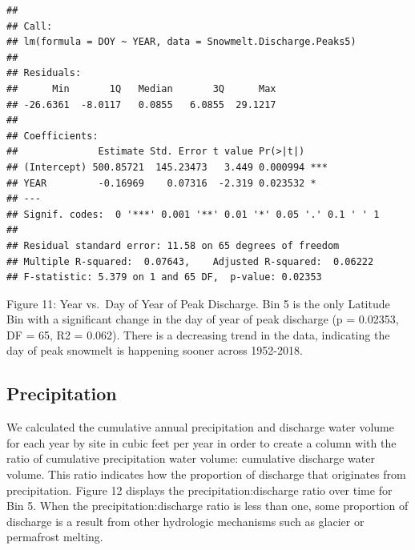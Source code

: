 \documentclass[12pt,]{article}
\begin{document}
\begin{verbatim}
## 
## Call:
## lm(formula = DOY ~ YEAR, data = Snowmelt.Discharge.Peaks5)
## 
## Residuals:
##      Min       1Q   Median       3Q      Max 
## -26.6361  -8.0117   0.0855   6.0855  29.1217 
## 
## Coefficients:
##              Estimate Std. Error t value Pr(>|t|)    
## (Intercept) 500.85721  145.23473   3.449 0.000994 ***
## YEAR         -0.16969    0.07316  -2.319 0.023532 *  
## ---
## Signif. codes:  0 '***' 0.001 '**' 0.01 '*' 0.05 '.' 0.1 ' ' 1
## 
## Residual standard error: 11.58 on 65 degrees of freedom
## Multiple R-squared:  0.07643,    Adjusted R-squared:  0.06222 
## F-statistic: 5.379 on 1 and 65 DF,  p-value: 0.02353
\end{verbatim}

Figure 11: Year vs.~Day of Year of Peak Discharge. Bin 5 is the only
Latitude Bin with a significant change in the day of year of peak
discharge (p = 0.02353, DF = 65, R2 = 0.062). There is a decreasing
trend in the data, indicating the day of peak snowmelt is happening
sooner across 1952-2018.

\hypertarget{precipitation-1}{%
\subsection{Precipitation}\label{precipitation-1}}

We calculated the cumulative annual precipitation and discharge water
volume for each year by site in cubic feet per year in order to create a
column with the ratio of cumulative precipitation water volume:
cumulative discharge water volume. This ratio indicates how the
proportion of discharge that originates from precipitation. Figure 12
displays the precipitation:discharge ratio over time for Bin 5. When the
precipitation:discharge ratio is less than one, some proportion of
discharge is a result from other hydrologic mechanisms such as glacier
or permafrost melting.
\end{document}
